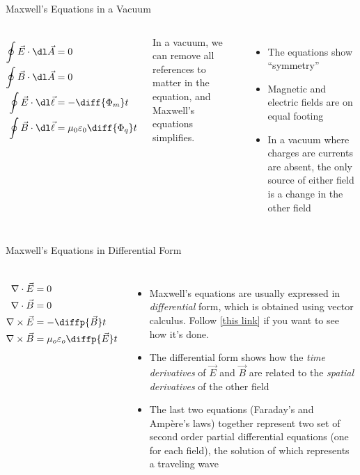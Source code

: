 \documentclass[12pt,aspectratio=169]{beamer}
\begin{document}
\begin{frame}{Maxwell's Equations in a Vacuum}
  \begin{columns}
    \large
    \begin{align*}
      \oint\vec E\cdot\dl\vec A &= 0 \\
      \oint\vec B\cdot\dl\vec A &= 0 \\
      \oint\vec E\cdot\dl\vec\ell &=-\diff{\Phi_m}t \\
      \oint\vec B\cdot\dl\vec\ell &=\mu_0\varepsilon_0\diff{\Phi_q}t\\
    \end{align*}

    In a vacuum, we can remove all references to matter in the equation, and
    Maxwell's equations simplifies.
    \begin{itemize}
    \item The equations show ``symmetry''
    \item Magnetic and electric fields are on equal footing
    \item In a vacuum where charges are currents are absent, the only source of
      either field is a change in the other field
    \end{itemize}
  \end{columns}
\end{frame}



\begin{frame}{Maxwell's Equations in Differential Form}
  \begin{columns}
    \large
    \begin{align*}
      \nabla\cdot\vec E &= 0\\
      \nabla\cdot\vec B &= 0\\
      \nabla\times\vec E &=-\diffp{\vec B}t \\
      \nabla\times\vec B &=\mu_o\varepsilon_o\diffp{\vec E}t
    \end{align*}

    \begin{itemize}
    \item Maxwell's equations are usually expressed in \emph{differential} form,
      which is obtained using vector calculus. Follow
      [\underline{\href{https://www.wikihow.com/Convert-Maxwell\%27s-Equations-into-Differential-Form}{this link}}] if you want to see how it's done.
    \item The differential form shows how the \emph{time derivatives} of
      $\vec E$ and $\vec B$ are related to the \emph{spatial derivatives}
      of the other field
    \item The last two equations (Faraday's and Amp\`{e}re's laws) together
      represent two set of second order partial differential equations (one for
      each field), the solution of which represents a traveling wave
    \end{itemize}
  \end{columns}
\end{frame}
\end{document}

